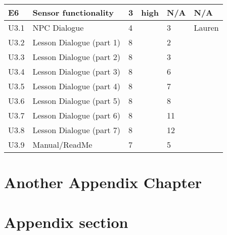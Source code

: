 \begin{longtable}[h!]{|p{1cm}|p{8.6cm}|p{1cm}|p{1.2cm}|p{1.2cm}|p{1.3cm}|}
	\midrule

	\textbf{E6}   & \textbf{Sensor functionality } & \textbf{3} & \textbf{high} & \textbf{N/A} & \textbf{N/A}\\
    \hline
    U3.1 & NPC Dialogue    & 4 & & 3 & Lauren\\
    \hline
    U3.2 & Lesson Dialogue (part 1) & 8 & & 2 & \\
    \hline
    U3.3 & Lesson Dialogue (part 2) & 8 & & 3 & \\
    \hline
    U3.4 & Lesson Dialogue (part 3) & 8 & & 6 & \\
    \hline
    U3.5 & Lesson Dialogue (part 4) & 8 & & 7 & \\
    \hline
    U3.6 & Lesson Dialogue (part 5) & 8 & & 8 & \\
    \hline
    U3.7 & Lesson Dialogue (part 6) & 8 & & 11 & \\
    \hline
    U3.8 & Lesson Dialogue (part 7) & 8 & & 12 & \\
    \hline
    U3.9 & Manual/ReadMe   & 7 & & 5 & \\
    \hline
    
	\midrule


\end{longtable}


\chapter{Another Appendix Chapter}
\blindtext[1]

\chapter{Appendix section}
\blindtext[1]

